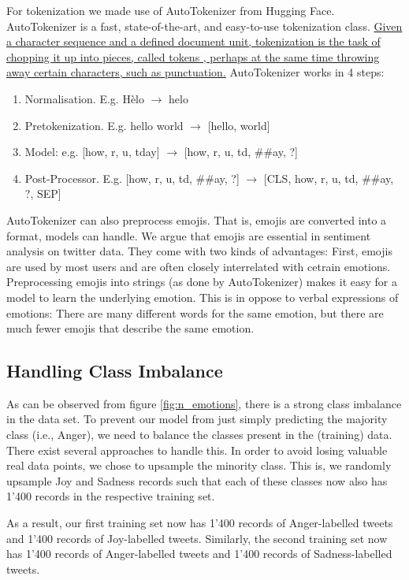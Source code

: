 \documentclass[fleqn,10pt]{SelfArx} %
\begin{document}
{For tokenization we made use of AutoTokenizer from Hugging Face. AutoTokenizer is a fast, state-of-the-art, and easy-to-use tokenization class. \href{https://medium.com/@awaldeep/hugging-face-understanding-tokenizers-1b7e4afdb154}{Given a character sequence and a defined document unit, tokenization is the task of chopping it up into pieces, called tokens , perhaps at the same time throwing away certain characters, such as punctuation.} AutoTokenizer works in 4 steps:
\begin{enumerate}[noitemsep]
    \item Normalisation. E.g. Hèlo $\rightarrow$ helo
    \item Pretokenization. E.g. hello world $\rightarrow$ [hello, world]
    \item Model: e.g. [how, r, u, tday] $\rightarrow$ [how, r, u, td, \#\#ay, ?]
    \item Post-Processor. E.g. [how, r, u, td, \#\#ay, ?] $\rightarrow$ [CLS, how, r, u, td, \#\#ay, ?, SEP]
\end{enumerate}

AutoTokenizer can also preprocess emojis. That is, emojis are converted into a format, models can handle. We argue that emojis are essential in sentiment analysis on twitter data. They come with two kinds of advantages: First, emojis are used by most users and are often closely interrelated with cetrain emotions. Preprocessing emojis into strings (as done by AutoTokenizer) makes it easy for a model to learn the underlying emotion. This is in oppose to verbal expressions of emotions: There are many different words for the same emotion, but there are much fewer emojis that describe the same emotion. 


\subsection{Handling Class Imbalance}
\label{sec: class_imbalance}
As can be observed from figure \ref{fig:n_emotions}, there is a strong class imbalance in the data set. To prevent our model from just simply predicting the majority class (i.e., Anger), we need to balance the classes present in the (training) data. There exist several approaches to handle this. In order to avoid losing valuable real data points, we chose to upsample the minority class. This is, we randomly upsample Joy and Sadness records such that each of these classes now also has 1'400 records in the respective training set.

As a result, our first training set now has 1'400 records of Anger-labelled tweets and 1'400 records of Joy-labelled tweets. Similarly, the second training set now has 1'400 records of Anger-labelled tweets and 1'400 records of Sadness-labelled tweets.

}
\end{document}
